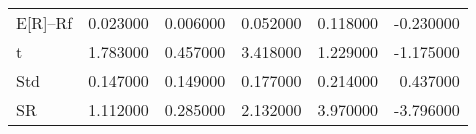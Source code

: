 \begin{tabular}{lrrrrr}
\toprule
\midrule
E[R]--Rf & 0.023000 & 0.006000 & 0.052000 & 0.118000 & -0.230000 \\
t & 1.783000 & 0.457000 & 3.418000 & 1.229000 & -1.175000 \\
Std & 0.147000 & 0.149000 & 0.177000 & 0.214000 & 0.437000 \\
SR & 1.112000 & 0.285000 & 2.132000 & 3.970000 & -3.796000 \\
\bottomrule
\end{tabular}
